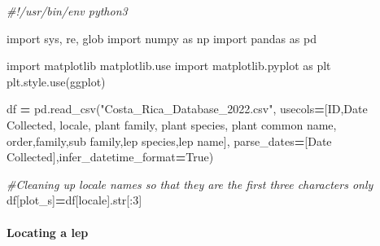 \documentclass[
]{article}
\newenvironment{Shaded}{\begin{snugshade}}{\end{snugshade}}
\newcommand{\BuiltInTok}[1]{#1}
\newcommand{\CommentTok}[1]{\textcolor[rgb]{0.56,0.35,0.01}{\textit{#1}}}
\newcommand{\DecValTok}[1]{\textcolor[rgb]{0.00,0.00,0.81}{#1}}
\newcommand{\ImportTok}[1]{#1}
\newcommand{\NormalTok}[1]{#1}
\newcommand{\OperatorTok}[1]{\textcolor[rgb]{0.81,0.36,0.00}{\textbf{#1}}}
\newcommand{\StringTok}[1]{\textcolor[rgb]{0.31,0.60,0.02}{#1}}
\newcommand{\VariableTok}[1]{\textcolor[rgb]{0.00,0.00,0.00}{#1}}
\begin{document}
\begin{Shaded}
\begin{Highlighting}[]
\CommentTok{\#!/usr/bin/env python3}

\ImportTok{import}\NormalTok{ sys, re, glob}
\ImportTok{import}\NormalTok{ numpy }\ImportTok{as}\NormalTok{ np }
\ImportTok{import}\NormalTok{ pandas }\ImportTok{as}\NormalTok{ pd}

\ImportTok{import}\NormalTok{ matplotlib}
\NormalTok{matplotlib.use}
\ImportTok{import}\NormalTok{ matplotlib.pyplot }\ImportTok{as}\NormalTok{ plt}
\NormalTok{plt.style.use(}\StringTok{\textquotesingle{}ggplot\textquotesingle{}}\NormalTok{)}

\NormalTok{df }\OperatorTok{=}\NormalTok{ pd.read\_csv(}\StringTok{"Costa\_Rica\_Database\_2022.csv"}\NormalTok{, }
\NormalTok{                 usecols}\OperatorTok{=}\NormalTok{[}\StringTok{\textquotesingle{}ID\textquotesingle{}}\NormalTok{,}\StringTok{\textquotesingle{}Date Collected\textquotesingle{}}\NormalTok{, }\StringTok{\textquotesingle{}locale\textquotesingle{}}\NormalTok{, }
                          \StringTok{\textquotesingle{}plant family\textquotesingle{}}\NormalTok{, }\StringTok{\textquotesingle{}plant species\textquotesingle{}}\NormalTok{, }\StringTok{\textquotesingle{}plant common name\textquotesingle{}}\NormalTok{,}
                          \StringTok{\textquotesingle{}order\textquotesingle{}}\NormalTok{,}\StringTok{\textquotesingle{}family\textquotesingle{}}\NormalTok{,}\StringTok{\textquotesingle{}sub family\textquotesingle{}}\NormalTok{,}\StringTok{\textquotesingle{}lep species\textquotesingle{}}\NormalTok{,}\StringTok{\textquotesingle{}lep name\textquotesingle{}}\NormalTok{], }
\NormalTok{                parse\_dates}\OperatorTok{=}\NormalTok{[}\StringTok{\textquotesingle{}Date Collected\textquotesingle{}}\NormalTok{],infer\_datetime\_format}\OperatorTok{=}\VariableTok{True}\NormalTok{)}
                
\CommentTok{\#Cleaning up locale names so that they are the first three characters only }
\NormalTok{df[}\StringTok{\textquotesingle{}plot\_s\textquotesingle{}}\NormalTok{]}\OperatorTok{=}\NormalTok{df[}\StringTok{\textquotesingle{}locale\textquotesingle{}}\NormalTok{].}\BuiltInTok{str}\NormalTok{[:}\DecValTok{3}\NormalTok{]}
\end{Highlighting}
\end{Shaded}

\hypertarget{locating-a-lep}{%
\paragraph{Locating a lep}\label{locating-a-lep}}
\end{document}

